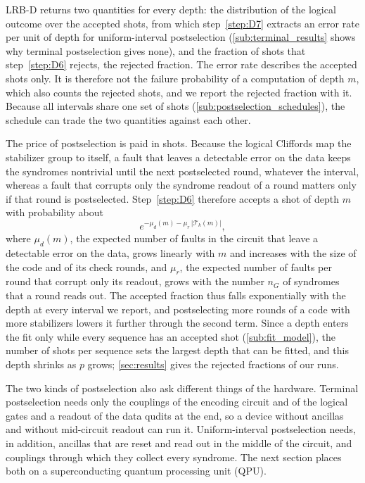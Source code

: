 LRB-D returns two quantities for every depth: the distribution of the logical outcome over the accepted shots, from which step~\ref{step:D7} extracts an error rate per unit of depth for uniform-interval postselection (\autoref{sub:terminal_results} shows why terminal postselection gives none), and the fraction of shots that step~\ref{step:D6} rejects, the rejected fraction. The error rate describes the accepted shots only. It is therefore not the failure probability of a computation of depth $m$, which also counts the rejected shots, and we report the rejected fraction with it. Because all intervals share one set of shots (\autoref{sub:postselection_schedules}), the schedule can trade the two quantities against each other.

The price of postselection is paid in shots. Because the logical Cliffords map the stabilizer group to itself, a fault that leaves a detectable error on the data keeps the syndromes nontrivial until the next postselected round, whatever the interval, whereas a fault that corrupts only the syndrome readout of a round matters only if that round is postselected. Step~\ref{step:D6} therefore accepts a shot of depth $m$ with probability about
\begin{equation}
    e^{-\mu_d(m) - \mu_r\,|\mathcal{T}_k(m)|} ,
    \label{eq:acceptance}
\end{equation}
where $\mu_d(m)$, the expected number of faults in the circuit that leave a detectable error on the data, grows linearly with $m$ and increases with the size of the code and of its check rounds, and $\mu_r$, the expected number of faults per round that corrupt only its readout, grows with the number $n_G$ of syndromes that a round reads out. The accepted fraction thus falls exponentially with the depth at every interval we report, and postselecting more rounds of a code with more stabilizers lowers it further through the second term. Since a depth enters the fit only while every sequence has an accepted shot (\autoref{sub:fit_model}), the number of shots per sequence sets the largest depth that can be fitted, and this depth shrinks as $p$ grows; \autoref{sec:results} gives the rejected fractions of our runs.

The two kinds of postselection also ask different things of the hardware. Terminal postselection needs only the couplings of the encoding circuit and of the logical gates and a readout of the data qudits at the end, so a device without ancillas and without mid-circuit readout can run it. Uniform-interval postselection needs, in addition, ancillas that are reset and read out in the middle of the circuit, and couplings through which they collect every syndrome. The next section places both on a superconducting quantum processing unit (QPU).
